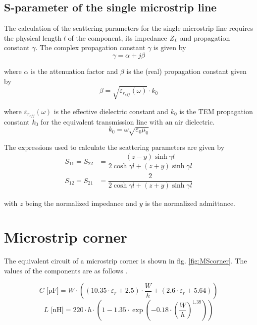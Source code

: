 \documentclass[10pt]{report}
\begin{document}
\subsection{S-parameter of the single microstrip line}

The calculation of the scattering parameters for the single microstrip
line requires the physical length $l$ of the component, its impedance
$Z_L$ and propagation constant $\gamma$.  The complex propagation
constant $\gamma$ is given by
\begin{equation}
\gamma = \alpha + j\beta
\end{equation}

where $\alpha$ is the attenuation factor and $\beta$ is the (real)
propagation constant given by
\begin{equation}
\beta = \sqrt{\varepsilon_{r_{eff}}(\omega)} \cdot k_0
\end{equation}

where $\varepsilon_{r_{eff}}(\omega)$ is the effective dielectric
constant and $k_0$ is the TEM propagation constant $k_0$ for the
equivalent transmission line with an air dielectric.
\begin{equation}
k_0 = \omega \sqrt{\varepsilon_0 \mu_0}
\end{equation}

The expressions used to calculate the scattering parameters are given
by
\begin{align}
S_{11} = S_{22} &= \dfrac{\left(z - y\right) \sinh{\gamma l}}{2\cosh{\gamma l} + \left(z + y\right) \sinh{\gamma l}}\\
S_{12} = S_{21} &= \dfrac{2}{2\cosh{\gamma l} + \left(z + y\right) \sinh{\gamma l}}
\end{align}

with $z$ being the normalized impedance and $y$ is the normalized
admittance.

\section{Microstrip corner}

The equivalent circuit of a microstrip corner is shown in fig.
\ref{fig:MScorner}. The values of the components are as follows
\cite{Kirschning4}.

\begin{equation}
C \text{ [pF]} = W \cdot \left( (10.35\cdot\varepsilon_r + 2.5) \cdot \frac{W}{h} +
			       (2.6\cdot\varepsilon_r + 5.64) \right)
\end{equation}
\begin{equation}
L \text{ [nH]} = 220\cdot h \cdot \left( 1 - 1.35\cdot\exp\left( -0.18\cdot
		   \left( \frac{W}{h} \right)^{1.39} \right) \right)
\end{equation}
\end{document}
